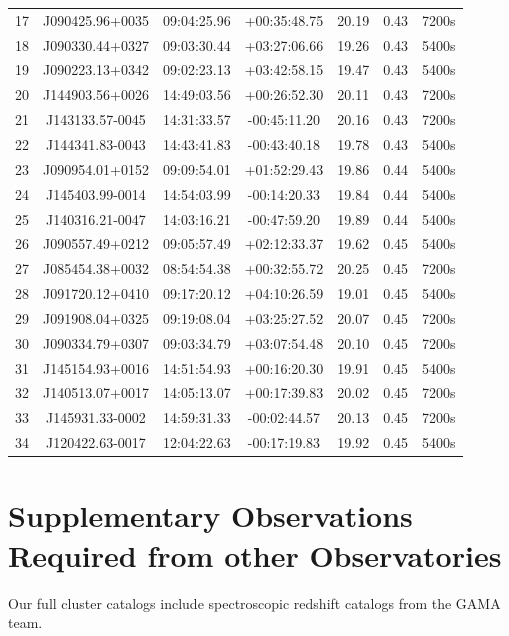 \documentclass[letterpaper,12pt]{article}
\begin{document}
\begin{table}
\begin{tabular}{ccccccc}
17 & J090425.96+0035 & 09:04:25.96 & +00:35:48.75 & 20.19 & 0.43 & 7200s \\
18 & J090330.44+0327 & 09:03:30.44 & +03:27:06.66 & 19.26 & 0.43 & 5400s \\
19 & J090223.13+0342 & 09:02:23.13 & +03:42:58.15 & 19.47 & 0.43 & 5400s \\
20 & J144903.56+0026 & 14:49:03.56 & +00:26:52.30 & 20.11 & 0.43 & 7200s \\
21 & J143133.57-0045 & 14:31:33.57 & -00:45:11.20 & 20.16 & 0.43 & 7200s \\
22 & J144341.83-0043 & 14:43:41.83 & -00:43:40.18 & 19.78 & 0.43 & 5400s \\
23 & J090954.01+0152 & 09:09:54.01 & +01:52:29.43 & 19.86 & 0.44 & 5400s \\
24 & J145403.99-0014 & 14:54:03.99 & -00:14:20.33 & 19.84 & 0.44 & 5400s \\
25 & J140316.21-0047 & 14:03:16.21 & -00:47:59.20 & 19.89 & 0.44 & 5400s \\
26 & J090557.49+0212 & 09:05:57.49 & +02:12:33.37 & 19.62 & 0.45 & 5400s \\
27 & J085454.38+0032 & 08:54:54.38 & +00:32:55.72 & 20.25 & 0.45 & 7200s \\
28 & J091720.12+0410 & 09:17:20.12 & +04:10:26.59 & 19.01 & 0.45 & 5400s \\
29 & J091908.04+0325 & 09:19:08.04 & +03:25:27.52 & 20.07 & 0.45 & 7200s \\
30 & J090334.79+0307 & 09:03:34.79 & +03:07:54.48 & 20.10 & 0.45 & 7200s \\
31 & J145154.93+0016 & 14:51:54.93 & +00:16:20.30 & 19.91 & 0.45 & 5400s \\
32 & J140513.07+0017 & 14:05:13.07 & +00:17:39.83 & 20.02 & 0.45 & 7200s \\
33 & J145931.33-0002 & 14:59:31.33 & -00:02:44.57 & 20.13 & 0.45 & 7200s \\
34 & J120422.63-0017 & 12:04:22.63 & -00:17:19.83 & 19.92 & 0.45 & 5400s \\
\hline
\end{tabular}
\end{table}

\section{Supplementary Observations Required from other Observatories}

Our full cluster catalogs include spectroscopic redshift catalogs from the GAMA team. 
\end{document}
